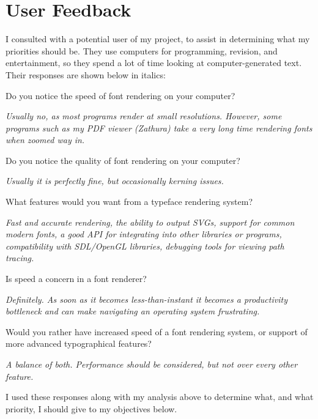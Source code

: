 \documentclass{report}
\begin{document}
\section{User Feedback}

I consulted with a potential user of my project, to assist in determining what
my priorities should be. They use computers for programming, revision, and
entertainment, so they spend a lot of time looking at computer-generated text.
Their responses are shown below in italics:

Do you notice the speed of font rendering on your computer?

\textit{Usually no, as most programs render at small resolutions. However, some
  programs such as my PDF viewer (Zathura) take a very long time rendering fonts
  when zoomed way in.}

Do you notice the quality of font rendering on your computer?

\textit{Usually it is perfectly fine, but occasionally kerning issues.}

What features would you want from a typeface rendering system?

\textit{Fast and accurate rendering, the ability to output SVGs, support for
  common modern fonts, a good API for integrating into other libraries or
  programs, compatibility with SDL/OpenGL libraries, debugging tools for viewing
  path tracing.}

Is speed a concern in a font renderer?

\textit{Definitely. As soon as it becomes less-than-instant it becomes a
  productivity bottleneck and can make navigating an operating system
  frustrating.}

Would you rather have increased speed of a font rendering system, or support of more advanced typographical features?

\textit{A balance of both. Performance should be considered, but not over every other feature.}

I used these responses along with my analysis above to determine what, and what
priority, I should give to my objectives below. 
\end{document}

